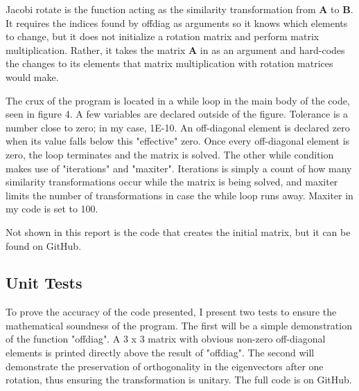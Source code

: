 \documentclass[10pt,showpacs,preprintnumbers,footinbib,amsmath,amssymb,aps,prl,twocolumn,groupedaddress,superscriptaddress,showkeys]{revtex4-1}
\begin{document}
\begin{comment}
\begin{lstlisting}
    for(int j = 0; j < 3; j++) relative_distance[j] = current.position[j]-other.position[j];
    double r = current.distance(other);
    double smoothing = epsilon*epsilon*epsilon;

    // Calculate the forces in each direction
    Fx -= this->G*current.mass*other.mass*relative_distance[0]/((r*r*r) + smoothing);
    Fy -= this->G*current.mass*other.mass*relative_distance[1]/((r*r*r) + smoothing);
    Fz -= this->G*current.mass*other.mass*relative_distance[2]/((r*r*r) + smoothing);
\end{lstlisting}
\end{comment}

Jacobi rotate is the function acting as the similarity transformation from ${\mathbf A}$ to ${\mathbf B}$. It requires the indices found by offdiag as arguments so it knows which elements to change, but it does not initialize a rotation matrix and perform matrix multiplication. Rather, it takes the matrix ${\mathbf A}$ in as an argument and hard-codes the changes to its elements that matrix multiplication with rotation matrices would make.


The crux of the program is located in a while loop in the main body of the code, seen in figure 4. A few variables are declared outside of the figure. Tolerance is a number close to zero; in my case, 1E-10. An off-diagonal element is declared zero when its value falls below this "effective" zero. Once every off-diagonal element is zero, the loop terminates and the matrix is solved. The other while condition makes use of "iterations" and "maxiter". Iterations is simply a count of how many similarity transformations occur while the matrix is being solved, and maxiter limits the number of transformations in case the while loop runs away. Maxiter in my code is set to 100.



Not shown in this report is the code that creates the initial matrix, but it can be found on GitHub.

	\subsection{Unit Tests}
To prove the accuracy of the code presented, I present two tests to ensure the mathematical soundness of the program. The first will be a simple demonstration of the function "offdiag". A 3 x 3 matrix with obvious non-zero off-diagonal elements is printed directly above the result of "offdiag". The second will demonstrate the preservation of orthogonality in the eigenvectors after one rotation, thus ensuring the transformation is unitary. The full code is on GitHub.
\end{document}
